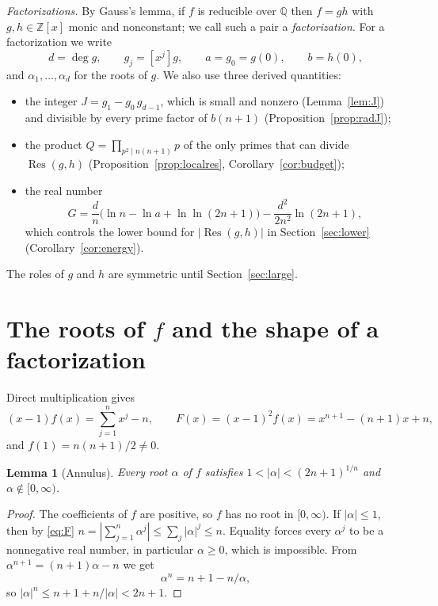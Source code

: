 \documentclass[11pt]{amsart}
\newtheorem{lemma}[theorem]{Lemma}
\theoremstyle{definition}
\theoremstyle{remark}
\numberwithin{equation}{section}
\newcommand{\Q}{\mathbb{Q}}
\newcommand{\Z}{\mathbb{Z}}
\newcommand{\Res}{\operatorname{Res}}
\begin{document}
\emph{Factorizations.} By Gauss's lemma, if $f$ is reducible over $\Q$ then
$f=gh$ with $g,h\in\Z[x]$ monic and nonconstant; we call such a pair a
\emph{factorization}. For a factorization we write
\[
 d=\deg g,\qquad g_j=[x^j]g,\qquad a=g_0=g(0),\qquad b=h(0),
\]
and $\alpha_1,\dots,\alpha_d$ for the roots of $g$. We also use three derived quantities:
\begin{itemize}
\item the integer $J=g_1-g_0\,g_{d-1}$, which is small and nonzero
 (Lemma~\ref{lem:J}) and divisible by every prime factor of $b(n+1)$
 (Proposition~\ref{prop:radJ});
\item the product $Q=\prod_{p^2\mid n(n+1)}p$ of the only primes that can
 divide $\Res(g,h)$ (Proposition~\ref{prop:localres}, Corollary~\ref{cor:budget});
\item the real number
 \[
  G=\frac dn\bigl(\ln n-\ln a+\ln\ln(2n+1)\bigr)-\frac{d^2}{2n^2}\ln(2n+1),
 \]
 which controls the lower bound for $|\Res(g,h)|$ in
 Section~\ref{sec:lower} (Corollary~\ref{cor:energy}).
\end{itemize}
The roles of $g$ and $h$ are symmetric until Section~\ref{sec:large}.

\section{The roots of \texorpdfstring{$f$}{f} and the shape of a factorization}\label{sec:roots}

Direct multiplication gives
\begin{equation}\label{eq:F}
 (x-1)f(x)=\sum_{j=1}^n x^j-n,\qquad
 F(x)=(x-1)^2f(x)=x^{n+1}-(n+1)x+n,
\end{equation}
and $f(1)=n(n+1)/2\ne0$.

\begin{lemma}[Annulus]\label{lem:annulus}
Every root $\alpha$ of $f$ satisfies $1<|\alpha|<(2n+1)^{1/n}$ and
$\alpha\notin[0,\infty)$.
\end{lemma}

\begin{proof}
The coefficients of $f$ are positive, so $f$ has no root in
$[0,\infty)$. If $|\alpha|\le1$, then by \eqref{eq:F}
$n=|\sum_{j=1}^n\alpha^j|\le\sum_j|\alpha|^j\le n$. Equality forces every
$\alpha^j$ to be a nonnegative real number, in particular $\alpha\ge0$,
which is impossible. From $\alpha^{n+1}=(n+1)\alpha-n$ we get
\begin{equation}\label{eq:rootid}
 \alpha^n=n+1-n/\alpha,
\end{equation}
so $|\alpha|^n\le n+1+n/|\alpha|<2n+1$.
\end{proof}
\end{document}
